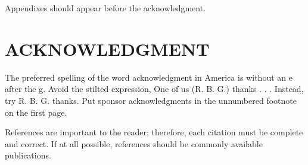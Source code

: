 \documentclass[letterpaper, 10 pt, conference]{ieeeconf}  %
\begin{document}
	Appendixes should appear before the acknowledgment.
	
	\section*{ACKNOWLEDGMENT}
	
	The preferred spelling of the word acknowledgment in America is without an e after the g. Avoid the stilted expression, One of us (R. B. G.) thanks . . .  Instead, try R. B. G. thanks. Put sponsor acknowledgments in the unnumbered footnote on the first page.
	
	
	
	
	References are important to the reader; therefore, each citation must be complete and correct. If at all possible, references should be commonly available publications.
	
	
	
\end{document}
